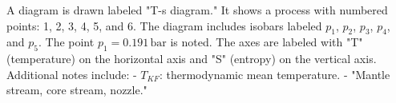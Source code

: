 A diagram is drawn labeled "T-s diagram." It shows a process with numbered points: 1, 2, 3, 4, 5, and 6. The diagram includes isobars labeled \( p_1 \), \( p_2 \), \( p_3 \), \( p_4 \), and \( p_5 \). The point \( p_1 = 0.191 \, \text{bar} \) is noted. The axes are labeled with "T" (temperature) on the horizontal axis and "S" (entropy) on the vertical axis. Additional notes include:  
- \( T_{KF} \): thermodynamic mean temperature.  
- "Mantle stream, core stream, nozzle."